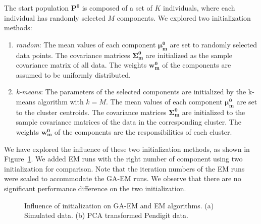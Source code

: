 \documentclass{article} %
\begin{document}
The start population $\mathbf{P^0}$ is composed of a set of $K$ individuals, where each individual has randomly selected $M$ components. We explored two initialization methods:
\begin{enumerate}
\item \textit{random}: The mean values of each component $\boldsymbol{\mu^0_m}$ are set to randomly selected data points. The covariance matrices $\boldsymbol{\Sigma^0_m}$ are initialized as the sample covariance matrix of all data. The weights $\mathbf{w^0_m}$ of the components are assumed to be uniformly distributed.
\item \textit{k-means}: The parameters of the selected components are initialized by the k-means algorithm with $k=M$. The mean values of each component $\boldsymbol{\mu^0_m}$ are set to the cluster centroids. The covariance matrices $\boldsymbol{\Sigma^0_m}$ are initialized to the sample covariance matrices of the data in the corresponding cluster. The weights $\mathbf{w^0_m}$ of the components are the responsibilities of each cluster.
\end{enumerate}

We have explored the influence of these two initialization methods, as shown in Figure~\ref{fig:init}. We added EM runs with the right number of component using two initialization for comparison. Note that the iteration numbers of the EM runs were scaled to accommodate the GA-EM runs. We observe that there are no significant performance difference on the two initialization.
\begin{figure}[htp]
  \begin{center}
  \end{center}
  \caption{Influence of initialization on GA-EM and EM algorithms. (a) Simulated data. (b) PCA transformed Pendigit data.}
  \label{fig:init}
\end{figure}
\end{document}
